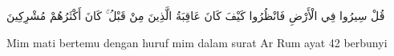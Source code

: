 \begin{center}
{\arabic  قُلْ سِيرُوا فِي الْأَرْضِ فَانْظُرُوا كَيْفَ كَانَ عَاقِبَةُ الَّذِينَ مِنْ قَبْلُ ۚ كَانَ أَكْثَرُهُمْ مُشْرِكِينَ } \par
\end{center}
Mim mati bertemu dengan huruf mim dalam  surat Ar Rum ayat 42 berbunyi

